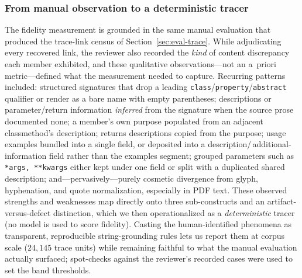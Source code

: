 \subsubsection{From manual observation to a deterministic tracer}
\label{sec:eval-fidelity-origin}
The fidelity measurement is grounded in the same manual evaluation that produced
the trace-link census of Section~\ref{sec:eval-trace}. While adjudicating every
recovered link, the reviewer also recorded the \emph{kind} of content
discrepancy each member exhibited, and these qualitative observations---not an
a~priori metric---defined what the measurement needed to capture. Recurring
patterns included: structured signatures that drop a leading
\texttt{class}/\texttt{property}/\texttt{abstract} qualifier or render as a bare
name with empty parentheses; descriptions or parameter/return information
\emph{inferred} from the signature when the source prose documented none; a
member's own purpose populated from an adjacent classmethod's description;
returns descriptions copied from the purpose; usage examples bundled into a
single field, or deposited into a description/\,additional-information field
rather than the examples segment; grouped parameters such as
\texttt{*args,\,**kwargs} either kept under one field or split with a duplicated
shared description; and---pervasively---purely cosmetic divergence from glyph,
hyphenation, and quote normalization, especially in PDF text. These observed
strengths and weaknesses map directly onto three sub-constructs and an
artifact-versus-defect distinction, which we then operationalized as a
\emph{deterministic} tracer (no model is used to score fidelity). Casting the
human-identified phenomena as transparent, reproducible string-grounding rules
lets us report them at corpus scale ($24{,}145$ trace units) while remaining
faithful to what the manual evaluation actually surfaced; spot-checks against the
reviewer's recorded cases were used to set the band thresholds.


